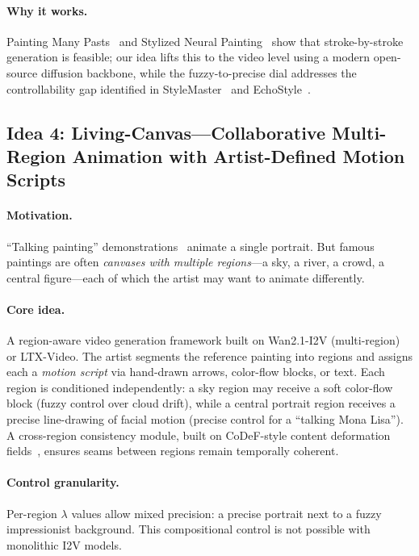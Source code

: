 \paragraph{Why it works.} Painting Many Pasts~\cite{zhao2020painting} and Stylized Neural
Painting~\cite{zou2021stylized} show that stroke-by-stroke generation is feasible; our
idea lifts this to the video level using a modern open-source diffusion backbone, while
the fuzzy-to-precise dial addresses the controllability gap identified in
StyleMaster~\cite{ye2025stylemaster} and EchoStyle~\cite{li2026echostyle}.

\subsection{Idea 4: Living-Canvas---Collaborative Multi-Region Animation with Artist-Defined Motion Scripts}
\label{sec:idea4}

\paragraph{Motivation.} ``Talking painting'' demonstrations~\cite{zakharov2019fewshot,guo2024liveportrait}
animate a single portrait. But famous paintings are often \emph{canvases with multiple
regions}---a sky, a river, a crowd, a central figure---each of which the artist may want
to animate differently.

\paragraph{Core idea.} A region-aware video generation framework built on
Wan2.1-I2V (multi-region) or LTX-Video. The artist segments the reference painting into
regions and assigns each a \emph{motion script} via hand-drawn arrows, color-flow
blocks, or text. Each region is conditioned independently: a sky region may receive a
soft color-flow block (fuzzy control over cloud drift), while a central portrait region
receives a precise line-drawing of facial motion (precise control for a ``talking
Mona Lisa''). A cross-region consistency module, built on CoDeF-style content
deformation fields~\cite{ouyang2024codef}, ensures seams between regions remain
temporally coherent.

\paragraph{Control granularity.} Per-region $\lambda$ values allow mixed precision: a
precise portrait next to a fuzzy impressionist background. This compositional control is
not possible with monolithic I2V models.

